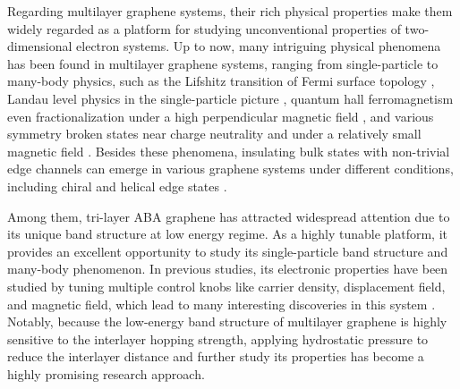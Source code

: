 Regarding multilayer graphene systems, their rich physical properties make them widely regarded as a platform 
for studying unconventional properties of two-dimensional electron systems. 
Up to now, many intriguing physical phenomena has been found in multilayer graphene systems, ranging from single-particle to many-body physics, 
such as the Lifshitz transition of Fermi surface topology \cite{shi2018tunable, bao2011stacking}, 
Landau level physics in the single-particle picture \cite{taychatanapat2011quantum, campos2016landau, che2020substrate, shimazaki2016landau},
quantum hall ferromagnetism even fractionalization under a high perpendicular magnetic field 
\cite{zhang2012hund, young2012spin, liu2022visualizing, coissard2022imaging, hunt2013massive, yu2014hierarchy, hunt2017direct, lee2014chemical, lee2013broken, stepanov2016tunable, datta2017strong}, 
and various symmetry broken states near charge neutrality and under a relatively small magnetic field \cite{weitz2010broken, stepanov2019quantum, zibrov2018emergent, winterer2022spontaneous}. 
Besides these phenomena, insulating bulk states with non-trivial edge channels can emerge in various graphene systems under different conditions, including chiral and helical edge states 
\cite{zhang2011spontaneous, young2014tunable, veyrat2020helical, geisenhof2021quantum, maher2013evidence, spanton2018observation, stepanov2019quantum, winterer2023ferroelectric, han2023correlated}.

Among them, tri-layer ABA graphene has attracted widespread attention due to its unique band structure at low energy regime. 
As a highly tunable platform, it provides an excellent opportunity to study its single-particle band structure and many-body phenomenon. 
In previous studies, its electronic properties have been studied by tuning multiple control knobs like carrier density, displacement field, and magnetic field, 
which lead to many interesting discoveries in this system \cite{taychatanapat2011quantum, campos2016landau, shimazaki2016landau, che2020substrate, bao2011stacking, stepanov2016tunable, lee2013broken, stepanov2019quantum, zibrov2018emergent, datta2017strong}.
Notably, because the low-energy band structure of multilayer graphene is highly sensitive to the interlayer hopping strength, 
applying hydrostatic pressure to reduce the interlayer distance and further study its properties has become a highly promising research approach. 

